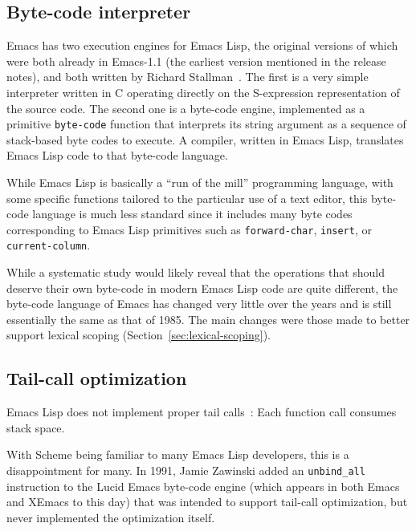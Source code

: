 \documentclass[format=acmsmall, review]{acmart}
\newcommand \Elisp {Emacs Lisp}
\begin{document}
\subsection{Byte-code interpreter}
\label{sec:byte-code-interpreter}

Emacs has two execution engines for \Elisp, the original versions of
which were both already in Emacs-1.1 (the earliest version mentioned in the
release notes), and both written by Richard
Stallman~\cite{RMS-compiler}.  The first is a very simple interpreter written in C
operating directly on the S-expression representation of the source code.
The second one is a byte-code engine, implemented as a primitive
\texttt{byte-code} function that interprets its string
argument as a sequence of stack-based byte codes to execute.  
A compiler, written in \Elisp{}, translates \Elisp{} code to that
byte-code language.

While \Elisp{} is basically a ``run of the mill'' programming language,
with some specific functions tailored to the particular use of a text
editor, this byte-code language is much less standard since it includes many
byte codes corresponding to \Elisp{} primitives such as
\texttt{forward-char}, \texttt{insert}, or \texttt{current-column}.

While a systematic study would likely reveal that the operations that should
deserve their own byte-code in modern \Elisp{} code are quite different, the
byte-code language of Emacs has changed very little over the years and is
still essentially the same as that of 1985.  The main changes were
those made to better support lexical scoping
(Section~\ref{sec:lexical-scoping}).

\subsection{Tail-call optimization}
\label{sec:tco}

\Elisp{} does not implement proper tail calls~\cite{Clinger1998}: Each
function call consumes stack space.

With Scheme being familiar to
many \Elisp{} developers, this is a disappointment for many.
In 1991, Jamie Zawinski added an \texttt{unbind\_all} instruction to
the Lucid Emacs byte-code engine (which appears in both Emacs and
XEmacs to this day) that was intended to support tail-call optimization,
but never implemented the optimization itself.
\end{document}
